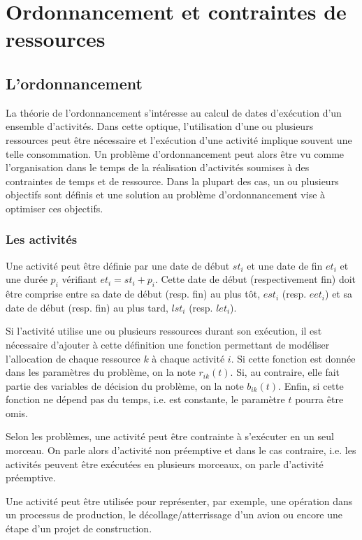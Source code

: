 \section{Ordonnancement et contraintes de ressources}
\label{sec:ordo}
\subsection{L'ordonnancement}
\label{sec:ordo_def}
La théorie de l'ordonnancement s'intéresse au calcul de dates
d'exécution d'un ensemble d'activités. Dans cette optique,
l'utilisation d'une ou plusieurs ressources peut être nécessaire et
l'exécution d'une activité implique souvent une telle consommation. Un
problème d'ordonnancement peut alors être vu comme l'organisation dans
le temps de la réalisation d'activités soumises à des contraintes de
temps et de ressource. Dans la plupart des cas, un ou plusieurs
objectifs sont définis et une solution au problème d'ordonnancement 
vise à optimiser ces objectifs.
 
\subsubsection{Les activités}

Une activité peut être définie par une date de début $st_i$ et une
date de fin $et_i$ et une durée $p_i$ vérifiant $et_i=st_i+p_i$. Cette
date de début (respectivement fin) doit être comprise entre sa date
de début (resp. fin) au plus tôt, $est_i$ (resp. $eet_i$) et sa date
de début (resp. fin) au plus tard, $lst_i$ (resp. $let_i$).

Si l'activité utilise une ou plusieurs ressources durant son
exécution, il est nécessaire d'ajouter à cette définition une fonction
permettant de modéliser l'allocation de chaque ressource $k$ à chaque
activité $i$. Si cette fonction est donnée dans les paramètres du
problème, on la note $r_{ik}(t)$. Si, au contraire, elle fait partie
des variables de décision du problème, on la note $b_{ik}(t)$. Enfin,
si cette fonction ne dépend pas du temps, i.e. est constante, le
paramètre $t$ pourra être omis.

Selon les problèmes, une activité peut être contrainte à s'exécuter en
un seul morceau. On parle alors d'activité non préemptive et dans le
cas contraire, i.e. les activités peuvent être exécutées en plusieurs
morceaux, on parle d'activité préemptive.

Une activité peut être utilisée pour représenter, par exemple, une
opération dans un processus de production, le décollage/atterrissage
d'un avion ou encore une étape d'un projet de construction.

